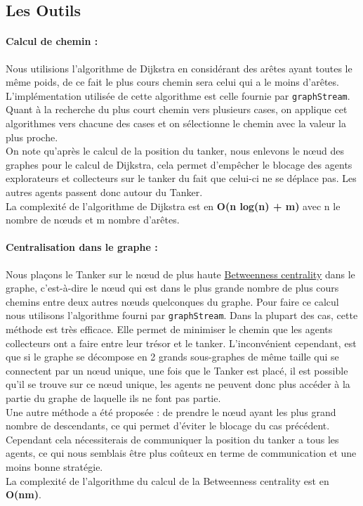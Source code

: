 \documentclass[10pt]{article}
\newcommand\tab[1][0.65cm]{\hspace*{#1}}
\begin{document}
\subsection{Les Outils}
\paragraph{Calcul de chemin :} Nous utilisions l'algorithme de Dijkstra en considérant des arêtes ayant toutes le même poids, de ce fait le plus cours chemin sera celui qui a le moins d'arêtes. L'implémentation utilisée de cette algorithme est celle fournie par \texttt{graphStream}. Quant à la recherche du plus court chemin vers plusieurs cases, on applique cet algorithmes vers chacune des cases et on sélectionne le chemin avec la valeur la plus proche.\\
\tab On note qu'après le calcul de la position du tanker, nous enlevons le n\oe{}ud des graphes pour le calcul de Dijkstra, cela permet d'empêcher le blocage des agents explorateurs et collecteurs sur le tanker du fait que celui-ci ne se déplace pas. Les autres agents passent donc autour du Tanker.\\
\tab La complexité de l'algorithme de Dijkstra est en \textbf{O(n log(n) + m)} avec n le nombre de n\oe{}uds et m nombre d'arêtes.

\paragraph{Centralisation dans le graphe :} Nous plaçons le Tanker sur le n\oe{}ud de plus haute \href{https://en.wikipedia.org/wiki/Betweenness_centrality}{Betweenness centrality} dans le graphe, c'est-à-dire le n\oe{}ud  qui est dans le plus grande nombre de plus cours chemins entre deux autres n\oe{}uds quelconques du graphe. Pour faire ce calcul nous utilisons l'algorithme fourni par \texttt{graphStream}. Dans la plupart des cas, cette méthode est très efficace. Elle permet de minimiser le chemin que les agents collecteurs ont a faire entre leur trésor et le tanker. L'inconvénient cependant, est que si le graphe se décompose en 2 grands sous-graphes de même taille qui se connectent par un n\oe{}ud unique, une fois que le Tanker est placé, il est possible qu'il se trouve sur ce n\oe{}ud unique, les agents ne peuvent donc plus accéder à la partie du graphe de laquelle ils ne font pas partie.\\
\tab Une autre méthode a été proposée : de prendre le n\oe{}ud ayant les plus grand nombre de descendants, ce qui permet d'éviter le blocage du cas précédent. Cependant cela nécessiterais de communiquer la position du tanker a tous les agents, ce qui nous semblais être plus coûteux en terme de communication et une moins bonne stratégie.\\
\tab La complexité de l'algorithme du calcul de la Betweenness centrality est en \textbf{O(nm)}.
\end{document}
